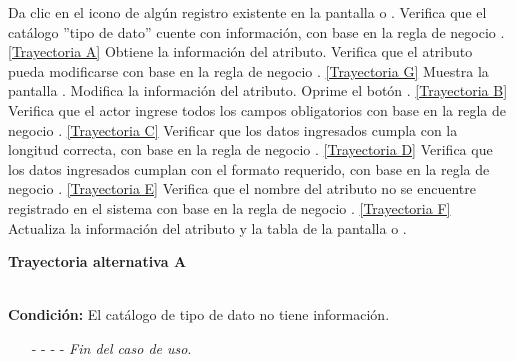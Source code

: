 	\begin{UCtrayectoria}
		\UCpaso[\UCactor] Da clic en el icono \editar de algún registro existente en la pantalla  o .
		\UCpaso[\UCsist] Verifica que el catálogo ''tipo de dato'' cuente con información, con base en la regla de negocio . \hyperlink{CU7-1-2:TAA}{[Trayectoria A]}
		\UCpaso[\UCsist] Obtiene la información del atributo.
		\UCpaso[\UCsist] Verifica que el atributo pueda modificarse con base en la regla de negocio . \hyperlink{CU7-1-2:TAF}{[Trayectoria G]}
		\UCpaso[\UCsist] Muestra la pantalla .
		\UCpaso[\UCactor] Modifica la información del atributo. \label{CU7.1.2-P4}
		\UCpaso[\UCactor] Oprime el botón . \hyperlink{CU7-1-2:TAB}{[Trayectoria B]}
		\UCpaso[\UCsist] Verifica que el actor ingrese todos los campos obligatorios con base en la regla de negocio . \hyperlink{CU7-1-2:TAC}{[Trayectoria C]}
		\UCpaso[\UCsist] Verificar que los datos ingresados cumpla con la longitud correcta, con base en la regla de negocio . \hyperlink{CU7-1-2:TAD}{[Trayectoria D]}
		\UCpaso[\UCsist] Verifica que los datos ingresados cumplan con el formato requerido, con base en la regla de negocio . \hyperlink{CU7-1-2:TAE}{[Trayectoria E]}
		\UCpaso[\UCsist] Verifica que el nombre del atributo no se encuentre registrado en el sistema con base en la regla de negocio . \hyperlink{CU7-1-2:TAF}{[Trayectoria F]}
		\UCpaso[\UCsist] Actualiza la información del atributo y la tabla  de la pantalla  o .
	\end{UCtrayectoria}		
\hypertarget{CU7-1-2:TAA}{\textbf{Trayectoria alternativa A}}\\
\noindent \textbf{Condición:} El catálogo de tipo de dato no tiene información.
\begin{enumerate}
	\UCpaso[\UCsist] Muestra el mensaje  en la pantalla  o  para indicar que no es posible realizar la operación debido a la falta de información necesaria para el sistema.
	\item[- -] - - {\em {Fin del caso de uso}}.%
\end{enumerate}
